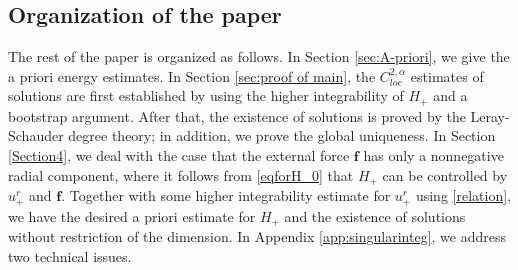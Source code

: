 \documentclass[12pt]{amsart}
\newcommand{\Bu}{{\boldsymbol{u}}}
\newcommand{\Bf}{{\boldsymbol{f}}}
\begin{document}
	\subsection{Organization of the paper}
	The rest of the paper is organized as follows. In Section \ref{sec:A-priori}, we give the a priori energy estimates. In Section \ref{sec:proof of main}, the $C^{2,\alpha}_{loc}$ estimates of solutions are first established by using the higher integrability of $H_+$ and a bootstrap argument. After that, the existence of solutions  is proved by the Leray-Schauder degree theory; in addition, we prove  the global uniqueness. In Section \ref{Section4}, we deal with the case that the external force $\Bf$ has only a nonnegative radial component, where it follows from \eqref{eqforH_0} that $H_+$ can be controlled by $u^r_+$ and $\Bf$. Together with some higher integrability estimate for  $u^r_+$ using \eqref{relation}, we have the desired a priori estimate for $H_+$ and the existence of solutions without restriction of the dimension.
	In Appendix \ref{app:singularinteg}, 
	we address two technical issues.
	
\end{document}
